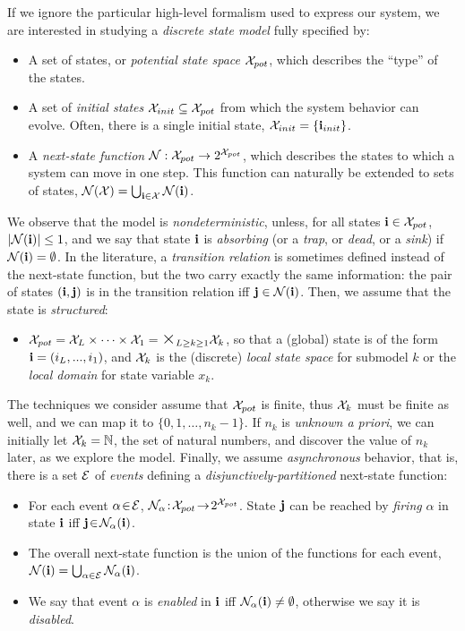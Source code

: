 \documentclass[copyright,creativecommons]{eptcs}
\renewcommand{\potxset}{\xset_{pot}}    \renewcommand{\initstate}{\vi_{init}}
\begin{document}
If we ignore the particular high-level formalism used to express our system,
we are interested in studying a \emph{discrete state model} fully specified by:
\begin{itemize}
\item A set of states, or \emph{potential state space} $\potxset$,
      which describes the ``type'' of the states.
\item A set of \emph{initial states} $\initstateset \subseteq \potxset$
      from which the system behavior can evolve.
      Often, there is a single initial state, $\initstateset = \{\initstate\}$.
\item A \emph{next-state function} $\nset : \potxset \rightarrow 2^{\potxset}$,
      which describes the states to which a system can move in one step.
      This function can naturally be extended to sets of states,
      $\mathcal{N}(\mathcal{X}) = \bigcup_{\mathbf{i} \in \mathcal{X}} \mathcal{N}(\mathbf{i})$.
\end{itemize}
We observe that the model is \emph{nondeterministic},
unless, for all states $\vi \in \potxset$, $|\mathcal{N}(\mathbf{i})| \leq 1$, and we say
that state $\mathbf{i}$ is \emph{absorbing} (or a \emph{trap}, or \emph{dead},
or a \emph{sink}) if $\mathcal{N}(\mathbf{i}) = \emptyset$.
In the literature, a \emph{transition relation} is sometimes defined
instead of the next-state function, but the two carry exactly
the same information: the pair of states
$(\mathbf{i},\mathbf{j})$ is in the transition relation iff $\mathbf{j} \in \mathcal{N}(\mathbf{i})$.
Then, we assume that the state is \emph{structured}:
\begin{itemize}
\item $\potxset = \xset_L \times \cdots \times \xset_1
      = \makebox{\Large$\times$}_{L \geq k \geq 1} \xset_k$, so that
      a (global) state is of the form $\mathbf{i} = (i_L,...,i_1)$, and
      $\mathcal{X}_k$ is the (discrete) \emph{local state space} for
      submodel $k$ or the \emph{local domain} for state variable $x_k$.
\end{itemize}
The techniques we consider assume that $\potxset$ is finite, thus $\mathcal{X}_k$
must be finite as well, and we can map it to $\{0,1,\ldots,n_k\!-\!1\}$.
If $n_k$ is \emph{unknown a priori}, we can initially
let $\mathcal{X}_k = \mathbb{N}$, the set of natural numbers,
and discover the value of $n_k$ later, as we explore the model.
Finally, we assume \emph{asynchronous} behavior, that is,
there is a set $\mathcal{E}$ of \emph{events} defining a
\emph{disjunctively-partitioned} next-state function:
\begin{itemize}
\item For each event $\alpha \!\in\! \mathcal{E}$,
      $\nset_{\alpha} \!:\! \potxset \!\rightarrow\! 2^{\potxset}$.
      State $\mathbf{j}$ can be reached by \emph{firing} $\alpha$ in state $\mathbf{i}$
      iff $\mathbf{j} \!\in\! \mathcal{N}_{\alpha}(\mathbf{i})$.
\item The overall next-state function is the union of the
      functions for each event,
      $\mathcal{N}(\mathbf{i}) = \bigcup_{\alpha\in\mathcal{E}} \mathcal{N}_{\alpha}(\mathbf{i})$.
\item
We say that event $\alpha$ is \emph{enabled} in $\mathbf{i}$ iff
$\mathcal{N}_{\alpha}(\mathbf{i}) \neq \emptyset$, otherwise we say it is \emph{disabled}.
\end{itemize}
\end{document}
